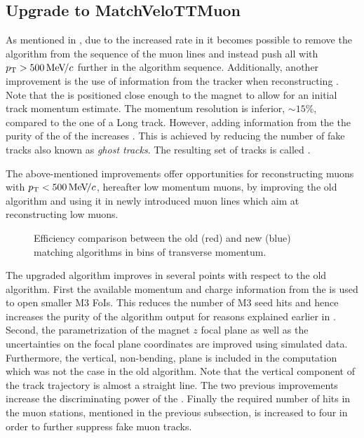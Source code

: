 \subsection{Upgrade to MatchVeloTTMuon}
\label{sec:matchvelottmuon}
As mentioned in , due to the increased \hltone rate in \runtwo it becomes possible to
remove the \mvm algorithm from the sequence of the \hltone muon lines and instead push all \veloTracks with
$\mbox{$p_{\rm T}$}>500 {\mathrm{\,Me\kern -0.1em V\!/}c}$ further in the algorithm sequence. Additionally, another improvement is the use of
information from the \ttracker tracker when reconstructing \veloTracks \cite{LHCb-PUB-2015-005}.
Note that the \ttracker is positioned close enough to the \lhcb magnet to allow for an initial track momentum estimate.
The \ttracker momentum resolution is inferior, $\sim 15\%$, compared to the one of a Long track.
However, adding information from the \ttracker the purity of the of the \veloTracks increases \cite{Bowen:2105078}.
This is achieved by reducing the number of fake tracks also known as {\it ghost tracks}.
The resulting set of tracks is called \veloTTracks.

The above-mentioned improvements offer opportunities for reconstructing muons with $\mbox{$p_{\rm T}$}<500 {\mathrm{\,Me\kern -0.1em V\!/}c}$,
hereafter low momentum muons, by improving the old \mvm algorithm and using it in newly introduced
\hltone muon lines which aim at reconstructing low \pt muons.

\begin{figure}[t]
  \centering
    \scalebox{.6}{}
  \caption{Efficiency comparison between the old (red) and new (blue) matching algorithms in bins of transverse momentum.}
 \label{mvm_eff_pt_zoom_comp}
\end{figure}

The upgraded \mvTTm algorithm improves in several points with respect to the old \mvm algorithm.
First the available momentum and charge information from the \ttracker is used to open smaller M3 FoIs.
This reduces the number of M3 seed hits and hence increases the purity of the \mvTTm algorithm output 
for reasons explained earlier in . Second, the parametrization of the magnet $z$
focal plane as well as the uncertainties on the focal plane coordinates are improved using simulated data.
Furthermore, the vertical, non-bending, plane is included in the \chisq computation which was not the
case in the old \mvm algorithm. Note that the vertical component of the track trajectory is almost a straight
line. The two previous improvements increase the discriminating power of the \chisq. Finally the required number
of hits in the muon stations, mentioned in the previous subsection, is increased to four in order to further
suppress fake muon tracks.


